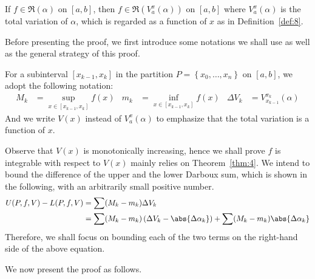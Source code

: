 \documentclass[thmcnt=section, 12pt]{elegantbook}
\begin{document}
\begin{theorem} 
    If $f \in \mathfrak{R}(\alpha)$ on $[a, b]$, then $f \in \mathfrak{R}(V_a^x(\alpha))$ on $[a, b]$ where $V_a^x(\alpha)$ is the total variation of $\alpha$, which is regarded as a function of $x$ as in Definition~\ref{def:8}.
\end{theorem}

\par Before presenting the proof, we first introduce some notations we shall use as well as the general strategy of this proof.

\par For a subinterval $[x_{k-1}, x_k]$ in the partition $P = \left\{ x_0, \ldots, x_n \right\}$ on $[a, b]$, we adopt the following notation:
\begin{align*}
    M_k &= \sup_{x \in [x_{k-1}, x_k]} f(x) &
    m_k &= \inf_{x \in [x_{k-1}, x_k]} f(x) & 
    \Delta V_k &= V_{x_{k-1}}^{x_k}(\alpha)
\end{align*}
And we write $V(x)$ instead of $V_a^x(\alpha)$ to emphasize that the total variation is a function of $x$.

\par Observe that $V(x)$ is monotonically increasing, hence we shall prove $f$ is integrable with respect to $V(x)$ mainly relies on Theorem~\ref{thm:4}. We intend to bound the difference of the upper and the lower Darboux sum, which is shown in the following, with an arbitrarily small positive number.
\begin{align*}
    U(P,f,V) - L(P,f,V)
    &= \sum (M_k - m_k) \Delta V_k \\ 
    &= \sum (M_k - m_k) \left( \Delta V_k - \abs{\Delta\alpha_k} \right)
    + \sum (M_k - m_k) \abs{\Delta\alpha_k}
\end{align*}
Therefore, we shall focus on bounding each of the two terms on the right-hand side of the above equation.

\par We now present the proof as follows.
\end{document}
